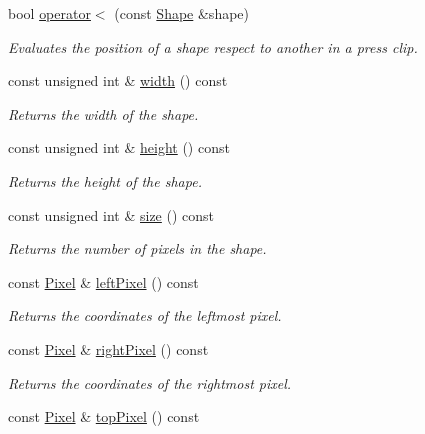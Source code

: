 \begin{CompactItemize}
bool \hyperlink{class_shape_183a6bc428172ced8122ffb68d0f04ef}{operator$<$} (const \hyperlink{class_shape}{Shape} \&shape)
\begin{CompactList}\small\item\em Evaluates the position of a shape respect to another in a press clip. \item\end{CompactList}\item 
const unsigned int \& \hyperlink{class_shape_6773dfedb96ef750e5469e22d51ecf0f}{width} () const 
\begin{CompactList}\small\item\em Returns the width of the shape. \item\end{CompactList}\item 
const unsigned int \& \hyperlink{class_shape_8400155046b2190bce621f8f366ef2be}{height} () const 
\begin{CompactList}\small\item\em Returns the height of the shape. \item\end{CompactList}\item 
const unsigned int \& \hyperlink{class_shape_8504d3be338d2fa594c35fe1444a9ed8}{size} () const 
\begin{CompactList}\small\item\em Returns the number of pixels in the shape. \item\end{CompactList}\item 
const \hyperlink{_shape_8hpp_535e59456e3e633842529cfa8ea103c4}{Pixel} \& \hyperlink{class_shape_53d49d362234068aad0b80986fabb85d}{leftPixel} () const 
\begin{CompactList}\small\item\em Returns the coordinates of the leftmost pixel. \item\end{CompactList}\item 
const \hyperlink{_shape_8hpp_535e59456e3e633842529cfa8ea103c4}{Pixel} \& \hyperlink{class_shape_c265e43fa90ee2ab7c9cd3a3d1e96d82}{rightPixel} () const 
\begin{CompactList}\small\item\em Returns the coordinates of the rightmost pixel. \item\end{CompactList}\item 
const \hyperlink{_shape_8hpp_535e59456e3e633842529cfa8ea103c4}{Pixel} \& \hyperlink{class_shape_063c4934d8c1cd4b02e4e3e4a604f62e}{topPixel} () const 

\end{CompactItemize}

